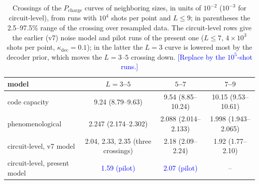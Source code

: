 \documentclass[a4paper]{article}
\newcommand{\blue}[1]{\textcolor{blue}{#1}}
\begin{document}
\begin{table}[t]
\centering
\caption{Crossings of the $P_{\mathrm{charge}}$ curves of neighboring sizes, in units of $10^{-2}$ ($10^{-3}$ for circuit-level), from runs with $10^4$ shots per point and $L\le9$; in parentheses the 2.5--97.5\% range of the crossing over resampled data. The circuit-level rows give the earlier (v7) noise model and pilot runs of the present one ($L\le7$, $4\times10^3$ shots per point, $\kappa_{\mathrm{dec}}=0.1$); in the latter the $L=3$ curve is lowered most by the decoder prior, which moves the $L=3$--$5$ crossing down. \blue{[Replace by the $10^5$-shot runs.]}}
\label{tab:thresholds}
\small
\begin{tabular}{lccc}
\hline
model & $L=3$--$5$ & $5$--$7$ & $7$--$9$\\
\hline
code capacity & 9.24 (8.79--9.63) & 9.54 (8.85--10.24) & 10.15 (9.53--10.61)\\
phenomenological & 2.247 (2.174--2.302) & 2.088 (2.014--2.133) & 1.998 (1.943--2.065)\\
circuit-level, v7 model & 2.04, 2.33, 2.35 (three crossings) & 2.18 (2.09--2.24) & 1.92 (1.77--2.10)\\
circuit-level, present model & \blue{1.59 (pilot)} & \blue{2.07 (pilot)} & \blue{--}\\
\hline
\end{tabular}
\end{table}
\end{document}
